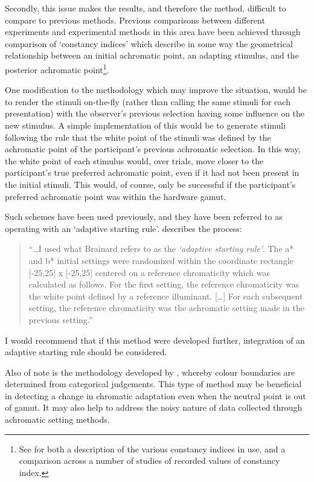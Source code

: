 Secondly, this issue makes the results, and therefore the method, difficult to compare to previous methods. Previous comparisons between different experiments and experimental methods in this area have been achieved through comparison of `constancy indices' which describe in some way the geometrical relationship between an initial achromatic point, an adapting stimulus, and the posterior achromatic point\footnote{See \citet{foster_color_2011} for both a description of the various constancy indices in use, and a comparison across a number of studies of recorded values of constancy index.}. 

One modification to the methodology which may improve the situation, would be to render the stimuli on-the-fly (rather than calling the same stimuli for each presentation) with the observer's previous selection having some influence on the new stimulus. A simple implementation of this would be to generate stimuli following the rule that the white point of the stimuli was defined by the achromatic point of the participant's previous achromatic selection. In this way, the white point of each stimulus would, over trials, move closer to the participant's true preferred achromatic point, even if it had not been present in the initial stimuli. This would, of course, only be successful if the participant's preferred achromatic point was within the hardware gamut. 

Such schemes have been used previously, and they have been referred to as operating with an `adaptive starting rule'. \citet{delahunt_evaluation_2001} describes the process:

\begin{quote}
``\dots I used what Brainard refers to as the \emph{`adaptive starting rule'}. The a* and b* initial settings were randomized within the coordinate rectangle [-25,25] x [-25,25] centered on a reference chromaticity which was calculated as follows. For the first setting, the reference chromaticity was the white point defined by a reference illuminant. [\dots] For each subsequent setting, the reference chromaticity was the achromatic setting made in the previous setting.''
\end{quote}

I would recommend that if this method were developed further, integration of an adaptive starting rule should be considered.

Also of note is the methodology developed by \citet{smithson_colour_2004}, whereby colour boundaries are determined from categorical judgements. This type of method may be beneficial in detecting a change in chromatic adaptation even when the neutral point is out of gamut. It may also help to address the noisy nature of data collected through achromatic setting methods.

